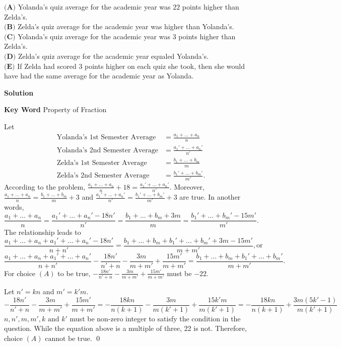 \documentclass{article}
\newenvironment{solution}{\begin{trivlist}\item[]
{\bf Solution}}{\qed \end{trivlist}}
\begin{document}
$\textbf{(A)}$ Yolanda's quiz average for the academic
year was $22$ points higher than Zelda's. \\
$\textbf{(B)}$ Zelda's quiz average for the academic
year was higher than Yolanda's. \\
$\textbf{(C)}$ Yolanda's quiz average for the academic
year was $3$ points higher than Zelda's. \\
$\textbf{(D)}$ Zelda's quiz average for the academic
year equaled Yolanda's. \\
$\textbf{(E)}$ If Zelda had scored $3$ points higher
on each quiz she took, then she would have had the same
average for the academic year as Yolanda.
\begin{solution}

\textbf{Key Word} Property of Fraction

Let
\begin{align*}
    \text{Yolanda's 1st Semester Average}
    &= \frac{a_1+\dots+a_n}{n} \\
    \text{Yolanda's 2nd Semester Average}
    &= \frac{a_1'+\dots+a_n'}{n'} \\
    \text{Zelda's 1st Semester Average}
    &= \frac{b_1+\dots+b_m}{m} \\
    \text{Zelda's 2nd Semester Average}
    &= \frac{b_1'+\dots+b_m'}{m'}.
\end{align*}
According to the problem, $\frac{a_1 + \dots + a_n}{n} + 18
= \frac{a_1' + \dots + a_n'}{n'}$. Moreover,
$\frac{a_1 + \dots + a_n}{n} = \frac{b_1 + \dots + b_m}{m} + 3$
and $\frac{a_1' + \dots + a_n'}{n'} =
\frac{b_1' + \dots + b_m'}{m'} + 3$ are true. In another words,
\[
\frac{a_1 + \dots + a_n}{n} =
\frac{a_1' + \dots + a_n' - 18n'}{n'} =
\frac{b_1 + \dots + b_m + 3m}{m} =
\frac{b_1' + \dots + b_m' - 15m'}{m'}.
\]
The relationship leads to
\[
\frac{a_1 + \dots + a_n + a_1' + \dots + a_n' - 18n'}
{n + n'} =
\frac{b_1 + \dots + b_m + b_1' + \dots + b_m' + 3m - 15m'}
{m + m'}, \text{or}
\]
\[
\frac{a_1 + \dots + a_n + a_1' + \dots + a_n'}
{n + n'} - \frac{18n'}{n' + n} - \frac{3m}{m + m'}
+ \frac{15m'}{m + m'} =
\frac{b_1 + \dots + b_m + b_1' + \dots + b_m'}{m + m'}.
\]
For choice $(A)$ to be true, $-\frac{18n'}{n' + n}
- \frac{3m}{m + m'} + \frac{15m'}{m + m'}$ must be $-22$.

Let $n' = kn$ and $m' = k'm$.
\[
-\frac{18n'}{n' + n} - \frac{3m}{m + m'} +
\frac{15m'}{m + m'} = -\frac{18kn}{n (k + 1)} -
\frac{3m}{m (k' + 1)} + \frac{15k'm}{m (k' + 1)} =
-\frac{18kn}{n (k + 1)} + \frac{3m (5k' - 1)}{m (k' + 1)}
\]
$n, n', m, m', k \text{ and } k'$ must be non-zero
integer to satisfy the condition in the question.
While the equation above is a multiple of three, 22 is not.
Therefore, choice $\boxed{(A) \text{ cannot be true.}}$
\end{solution}
\end{document}
